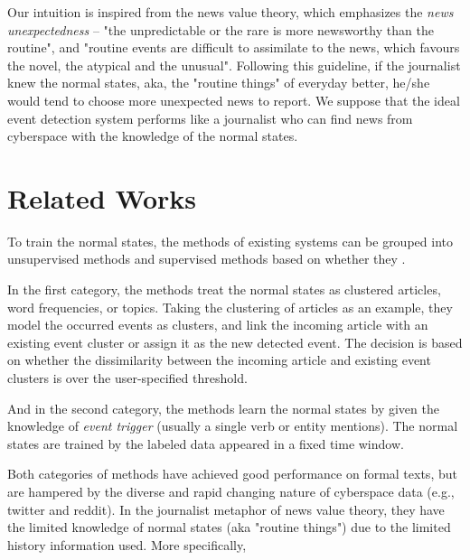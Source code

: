 \documentclass[11pt]{article}
\begin{document}
Our intuition is inspired from the news value theory\cite{galtung1965structure}\cite{caple2013delving}, which emphasizes the \textit{news unexpectedness} -- "the unpredictable or the rare is more newsworthy than the routine"\cite{bell1991language}, and "routine events are difficult to assimilate to the news, which favours the novel, the atypical and the unusual"\cite{montgomery2007discourse}.
Following this guideline, if the journalist knew the normal states, aka, the "routine things" of everyday better, he/she would tend to choose more unexpected news to report. 
We suppose that the ideal event detection system performs like a journalist who can find news from cyberspace with the knowledge of the normal states. 


\section{Related Works}

To train the normal states, the methods of existing systems can be grouped into unsupervised methods and supervised methods based on whether they .

In the first category, the methods treat the normal states as clustered articles\cite{Petrovic:2010uj}\cite{Wurzer:2015wq}, word frequencies\cite{Mathioudakis:2010fc}\cite{Weng:2011wz}, or topics\cite{Diao:2012wj}\cite{Yan:2015wm}. 
Taking the clustering of articles\cite{Petrovic:2010uj}\cite{Wurzer:2015wq} as an example, they model the occurred events as clusters, and link the incoming article with an existing event cluster or assign it as the new detected event.
The decision is based on whether the dissimilarity between the incoming article and existing event clusters is over the user-specified threshold. 

And in the second category, the methods learn the normal states by given the knowledge of \textit{event trigger}\cite{Li2013JointEE}\cite{Nguyen2015EventDA} (usually a single verb or entity mentions). The normal states are trained by the labeled data appeared in a fixed time window.

Both categories of methods have achieved good performance on formal texts, but are hampered by the diverse and rapid changing nature of cyberspace data (e.g., twitter\cite{Asur:2011tc} and reddit\cite{singer2014evolution}).
In the journalist metaphor of news value theory, they have the limited knowledge of normal states (aka "routine things") due to the limited history information used. 
More specifically, 
\end{document}
